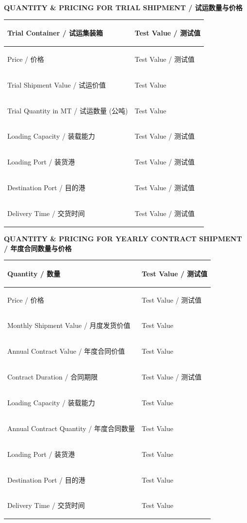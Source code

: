 \documentclass[a4paper,11pt]{article}
\begin{document}
\begin{center}{\large\textbf{\color{marooncolor}QUANTITY \& PRICING FOR TRIAL SHIPMENT / 试运数量与价格}}\end{center}
\vspace{0.1cm}
\begin{center}
\begin{tabularx}{\textwidth}{|>{\bfseries\raggedright\arraybackslash}p{6cm}|>{\raggedright\arraybackslash}X|}
\hline
Trial Container / 试运集装箱 & Test Value / 测试值 \\ \hline
Price / 价格 & Test Value / 测试值 \\ \hline
Trial Shipment Value / 试运价值 & Test Value \\ \hline
Trial Quantity in MT / 试运数量 (公吨) & Test Value \\ \hline
Loading Capacity / 装载能力 & Test Value / 测试值 \\ \hline
Loading Port / 装货港 & Test Value / 测试值 \\ \hline
Destination Port / 目的港 & Test Value / 测试值 \\ \hline
Delivery Time / 交货时间 & Test Value / 测试值 \\ \hline
\end{tabularx}
\end{center}

\vspace{0.3cm}

\begin{center}{\large\textbf{\color{marooncolor}QUANTITY \& PRICING FOR YEARLY CONTRACT SHIPMENT / 年度合同数量与价格}}\end{center}
\vspace{0.1cm}
\begin{center}
\begin{tabularx}{\textwidth}{|>{\bfseries\raggedright\arraybackslash}p{6cm}|>{\raggedright\arraybackslash}X|}
\hline
Quantity / 数量 & Test Value / 测试值 \\ \hline
Price / 价格 & Test Value / 测试值 \\ \hline
Monthly Shipment Value / 月度发货价值 & Test Value \\ \hline
Annual Contract Value / 年度合同价值 & Test Value \\ \hline
Contract Duration / 合同期限 & Test Value / 测试值 \\ \hline
Loading Capacity / 装载能力 & Test Value \\ \hline
Annual Contract Quantity / 年度合同数量 & Test Value \\ \hline
Loading Port / 装货港 & Test Value \\ \hline
Destination Port / 目的港 & Test Value \\ \hline
Delivery Time / 交货时间 & Test Value \\ \hline
\end{tabularx}
\end{center}
\end{document}
